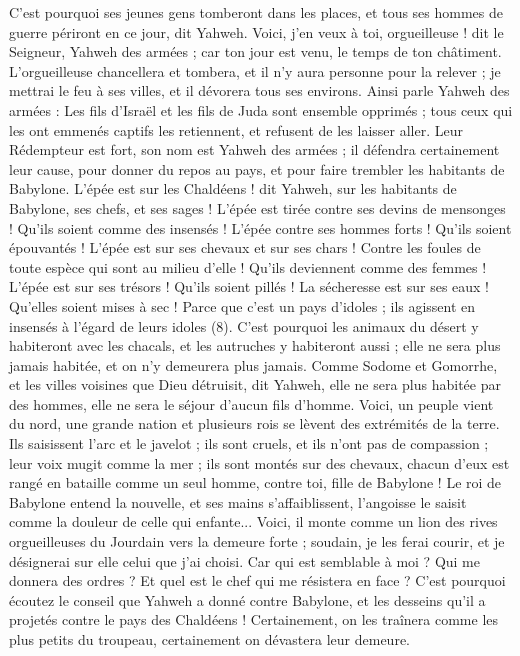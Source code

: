 \begin{multicols}{2}
C'est pourquoi ses jeunes gens tomberont dans les places, et tous ses hommes de guerre périront en ce jour, dit Yahweh.
Voici, j'en veux à toi, orgueilleuse ! dit le Seigneur, Yahweh des armées ; car ton jour est venu, le temps de ton châtiment.
L’orgueilleuse chancellera et tombera, et il n'y aura personne pour la relever ; je mettrai le feu à ses villes, et il dévorera tous ses environs.
Ainsi parle Yahweh des armées : Les fils d'Israël et les fils de Juda sont ensemble opprimés ; tous ceux qui les ont emmenés captifs les retiennent, et refusent de les laisser aller.
Leur Rédempteur est fort, son nom est Yahweh des armées ; il défendra certainement leur cause, pour donner du repos au pays, et pour faire trembler les habitants de Babylone.
L'épée est sur les Chaldéens ! dit Yahweh, sur les habitants de Babylone, ses chefs, et ses sages !
L'épée est tirée contre ses devins de mensonges ! Qu’ils soient comme des insensés ! L’épée contre ses hommes forts ! Qu’ils soient épouvantés !
L'épée est sur ses chevaux et sur ses chars ! Contre les foules de toute espèce qui sont au milieu d'elle ! Qu’ils deviennent comme des femmes ! L’épée est sur ses trésors ! Qu’ils soient pillés !
La sécheresse est sur ses eaux ! Qu’elles soient mises à sec ! Parce que c'est un pays d'idoles ; ils agissent en insensés à l'égard de leurs idoles (8).
C'est pourquoi les animaux du désert y habiteront avec les chacals, et les autruches y habiteront aussi ; elle ne sera plus jamais habitée, et on n'y demeurera plus jamais.
Comme Sodome et Gomorrhe, et les villes voisines que Dieu détruisit, dit Yahweh, elle ne sera plus habitée par des hommes, elle ne sera le séjour d'aucun fils d'homme.
Voici, un peuple vient du nord, une grande nation et plusieurs rois se lèvent des extrémités de la terre.
Ils saisissent l'arc et le javelot ; ils sont cruels, et ils n'ont pas de compassion ; leur voix mugit comme la mer ; ils sont montés sur des chevaux, chacun d'eux est rangé en bataille comme un seul homme, contre toi, fille de Babylone !
Le roi de Babylone entend la nouvelle, et ses mains s'affaiblissent, l'angoisse le saisit comme la douleur de celle qui enfante...
Voici, il monte comme un lion des rives orgueilleuses du Jourdain vers la demeure forte ;  soudain, je les ferai courir, et je désignerai sur elle celui que j'ai choisi. Car qui est semblable à moi ? Qui me donnera des ordres ? Et quel est le chef qui me résistera en face ?
C'est pourquoi écoutez le conseil que Yahweh a donné contre Babylone, et les desseins qu'il a projetés contre le pays des Chaldéens ! Certainement, on les traînera comme les plus petits du troupeau, certainement on dévastera leur demeure.

\end{multicols}
